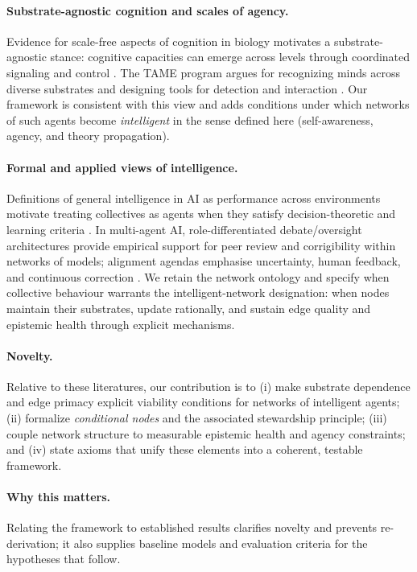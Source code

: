 \documentclass[12pt]{article}
\begin{document}
\paragraph{Substrate-agnostic cognition and scales of agency.}
Evidence for scale-free aspects of cognition in biology motivates a substrate-agnostic stance: cognitive capacities can emerge across levels through coordinated signaling and control \citep{Levin2019}. The TAME program argues for recognizing minds across diverse substrates and designing tools for detection and interaction \citep{TAME2021}. Our framework is consistent with this view and adds conditions under which networks of such agents become \emph{intelligent} in the sense defined here (self-awareness, agency, and theory propagation).

\paragraph{Formal and applied views of intelligence.}
Definitions of general intelligence in AI as performance across environments motivate treating collectives as agents when they satisfy decision-theoretic and learning criteria \citep{LeggHutter2007}. In multi-agent AI, role-differentiated debate/oversight architectures provide empirical support for peer review and corrigibility within networks of models; alignment agendas emphasise uncertainty, human feedback, and continuous correction \citep{Amodei2016,Russell2019}. We retain the network ontology and specify when collective behaviour warrants the intelligent-network designation: when nodes maintain their substrates, update rationally, and sustain edge quality and epistemic health through explicit mechanisms.

\paragraph{Novelty.}
Relative to these literatures, our contribution is to (i) make substrate dependence and edge primacy explicit viability conditions for networks of intelligent agents; (ii) formalize \emph{conditional nodes} and the associated stewardship principle; (iii) couple network structure to measurable epistemic health and agency constraints; and (iv) state axioms that unify these elements into a coherent, testable framework.

\paragraph{Why this matters.} Relating the framework to established results clarifies novelty and prevents re-derivation; it also supplies baseline models and evaluation criteria for the hypotheses that follow.
\end{document}
